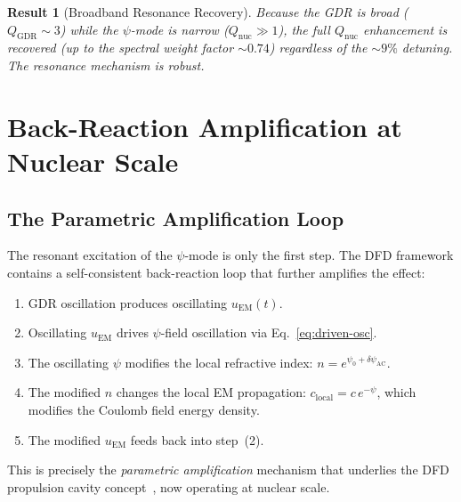 \documentclass[aps,prd,twocolumn,superscriptaddress,nofootinbib]{revtex4-2}
\newcommand{\Qnuc}{Q_{\mathrm{nuc}}}
\newtheorem{result}{Result}
\begin{document}
\begin{result}[Broadband Resonance Recovery]
Because the GDR is broad ($Q_{\mathrm{GDR}} \sim 3$) while the
$\psi$-mode is narrow ($\Qnuc \gg 1$), the full $\Qnuc$ enhancement
is recovered (up to the spectral weight factor $\sim\!0.74$)
regardless of the $\sim\!9\%$ detuning.  The resonance mechanism
is robust.
\end{result}


\section{Back-Reaction Amplification at Nuclear Scale}
\label{sec:back-reaction}

\subsection{The Parametric Amplification Loop}
\label{sec:parametric}

The resonant excitation of the $\psi$-mode is only the first step.
The DFD framework contains a self-consistent back-reaction loop
that further amplifies the effect:

\begin{enumerate}[nosep]
\item GDR oscillation produces oscillating $u_{\mathrm{EM}}(t)$.
\item Oscillating $u_{\mathrm{EM}}$ drives $\psi$-field oscillation
via Eq.~\eqref{eq:driven-osc}.
\item The oscillating $\psi$ modifies the local refractive index:
$n = e^{\psi_0 + \delta\psi_{\mathrm{AC}}}$.
\item The modified $n$ changes the local EM propagation:
$c_{\mathrm{local}} = c\,e^{-\psi}$, which modifies the Coulomb
field energy density.
\item The modified $u_{\mathrm{EM}}$ feeds back into step~(2).
\end{enumerate}

This is precisely the \emph{parametric amplification} mechanism that
underlies the DFD propulsion cavity concept~\cite{Alcock2026Core},
now operating at nuclear scale.
\end{document}

